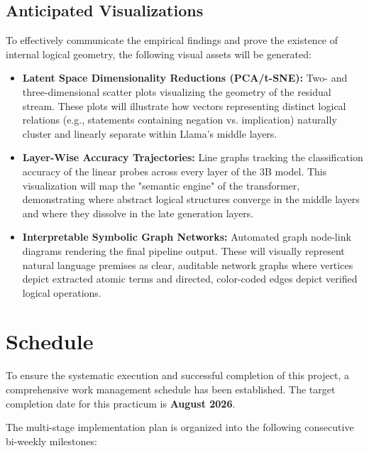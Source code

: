 \documentclass[12 pt]{article}  %
\begin{document}
\subsection{Anticipated Visualizations}
To effectively communicate the empirical findings and prove the existence of internal logical geometry, the following visual assets will be generated:
\begin{itemize}
    \item \textbf{Latent Space Dimensionality Reductions (PCA/t-SNE):} Two- and three-dimensional scatter plots visualizing the geometry of the residual stream. These plots will illustrate how vectors representing distinct logical relations (e.g., statements containing negation vs. implication) naturally cluster and linearly separate within Llama's middle layers.
    \item \textbf{Layer-Wise Accuracy Trajectories:} Line graphs tracking the classification accuracy of the linear probes across every layer of the 3B model. This visualization will map the "semantic engine" of the transformer, demonstrating where abstract logical structures converge in the middle layers and where they dissolve in the late generation layers.
    \item \textbf{Interpretable Symbolic Graph Networks:} Automated graph node-link diagrams rendering the final pipeline output. These will visually represent natural language premises as clear, auditable network graphs where vertices depict extracted atomic terms and directed, color-coded edges depict verified logical operations.
\end{itemize}

\newpage
\section{Schedule}
To ensure the systematic execution and successful completion of this project, a comprehensive work management schedule has been established. The target completion date for this practicum is \textbf{August 2026}.

The multi-stage implementation plan is organized into the following consecutive bi-weekly milestones:
\end{document}
